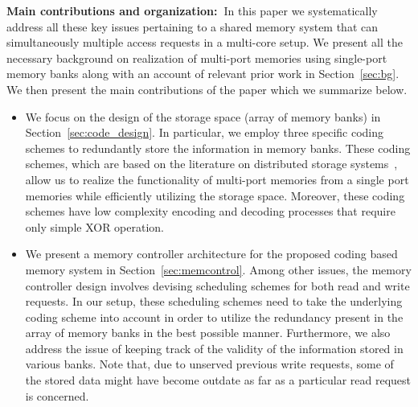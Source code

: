 \noindent \textbf{Main contributions and organization:~}In this paper we systematically address all these key issues pertaining to a shared memory system that can simultaneously multiple access requests in a multi-core setup. We present all the necessary background on realization of multi-port memories using single-port memory banks along with an account of relevant prior work in Section~\ref{sec:bg}. We then present the main contributions of the paper which we summarize below. %
\begin{itemize}
\item We focus on the design of the storage space (array of memory banks) in Section~\ref{sec:code_design}. In particular, we employ three specific coding schemes to redundantly store the information in memory banks. These coding schemes, which are based on the literature on distributed storage systems~\cite{dimakis, Gopalan12, batchcodes, RPDV16}, allow us to realize the functionality of multi-port memories from a single port memories while efficiently utilizing the storage space. Moreover, these coding schemes have low complexity encoding and decoding processes that require only simple XOR operation. %
\item We present a memory controller architecture for the proposed coding based memory system in Section~\ref{sec:memcontrol}. Among other issues, the memory controller design involves devising scheduling schemes for both read and write requests. In our setup, these scheduling schemes need to take the underlying coding scheme into account in order to utilize the redundancy present in the array of memory banks in the best possible manner. Furthermore, we also address the issue of keeping track of the validity of the information stored in various banks. Note that, due to unserved previous write requests, some of the stored data might have become outdate as far as a particular read request is concerned.

\end{itemize}
